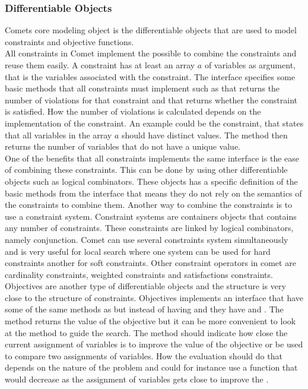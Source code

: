 \subsubsection{Differentiable Objects} \label{difObj}
Comets core modeling object is the differentiable objects that are used to model constraints and objective functions. \\
All constraints in Comet implement the %
possible to combine the constraints and reuse them easily. A constraint has at least an array $a$ of 
variables as argument, that is the variables associated with the constraint. The interface specifies some basic 
methods that all constraints must implement such as  that returns the number 
of violations for that constraint and  that returns whether the constraint is satisfied. How the number 
of violations is calculated depends on the implementation of the constraint. An example could be the 
 constraint, that states that all variables in the array $a$ should have distinct values. The 
method  then returns the number of variables that do not have a unique value. \medskip \\ 
One of the benefits that all constraints implements the same interface is the ease of combining these constraints. 
This can be done by using other differentiable objects such as logical combinators. These objects has a specific 
definition of the basic methods from the  interface that means they do not rely on the semantics 
of the constraints to combine them. 
Another way to combine the constraints is to use a constraint system. Constraint systems are containers objects that 
contains any number of constraints. These constraints are linked by logical combinators, namely conjunction. Comet can 
use several constraints system simultaneously and is very useful for local search where one system can be used for hard 
constraints another for soft constraints. Other constraint operators in comet are cardinality constraints, weighted 
constraints and satisfactions constraints. \medskip \\
Objectives are another type of differentiable objects and the structure is very close to the structure of constraints. 
Objectives implements an interface  that have some of the same methods as  
but instead of having  and  they have  and . 
The method  returns the value of the objective but it can be more convenient to look at the method 
 to guide the search. The method  should indicate how close the current 
assignment of variables is to 
improve the value of the objective or be used to compare two assignments of variables. How the evaluation should do 
that depends on the nature of the problem and could for instance use a function that would decrease as the assignment 
of variables gets close to improve the .
